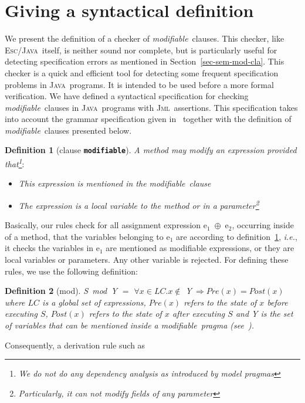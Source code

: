 \documentclass[a4paper]{llncs}
\newcommand{\jml}{\textsc{Jml}}
\newcommand{\escj}{\textsc{Esc/Java}}
\newcommand{\java}{\textsc{Java}}
\newcommand{\modif}{\textit{modifiable}}
\newtheorem {df}{Definition}
\begin{document}
\section{Giving a syntactical definition}
\label{sec-giv-sin-def}
We present the definition of a checker of \modif~clauses. This
checker, like \escj~itself, is neither sound nor complete, but is
particularly useful for detecting specification errors as
mentioned in Section~\ref{sec-sem-mod-cla}. This checker is a quick
and efficient tool
for detecting some frequent
specification
problems in \java~programs. It is intended to be used before a more
formal verification. We have defined a syntactical specification for
checking \modif~clauses in \java~programs with \jml~assertions. This
specification takes into account the grammar specification
given in~\cite{LBR00} together with the definition of \modif~clauses
presented below.
\begin{df}[clause {\tt \bf modifiable}]
\label{def-mod}
A method may modify an expression provided that\footnote{We do not do
any dependency analysis as introduced by \emph{model} pragmas}$:$ 
\begin{itemize}
\item This expression is mentioned in the \modif~clause
\item The expression is a local variable to the method or in a
parameter\footnote{Particularly, it can not modify fields of any
parameter}
\end{itemize}
\end{df}
Basically, our rules check for all assignment expression \textup{e}$_1$\
$\oplus$\ \textup{e}$_2$, occurring inside of a
method, that the variables belonging to \textup{e}$_1$ are
according to definition~\ref{def-mod}, \emph{i.e.}, it checks the
variables in \textup{e}$_1$ are mentioned as modifiable expressions,
or they are local variables or parameters. Any other variable
is rejected. For defining these rules, we use the
following definition$:$
\begin{df}[mod]
\textup{S}\ \textit{mod}\ \textsc{Y} $=$ $\forall x \in LC.
x\not\in$ \textsc{Y}$\ \Rightarrow Pre(x) = Post(x)$ \\
where $LC$ is a global set of expressions, $Pre(x)$
refers to the state of $x$ before executing $S$,
$Post(x)$ refers to the state of $x$ after executing
$S$ and \textsc{Y} is the set of variables that can be mentioned
inside a \modif~pragma (see~\cite{LBR00}).
\end{df}
Consequently, a derivation rule such as \\
\end{document}
